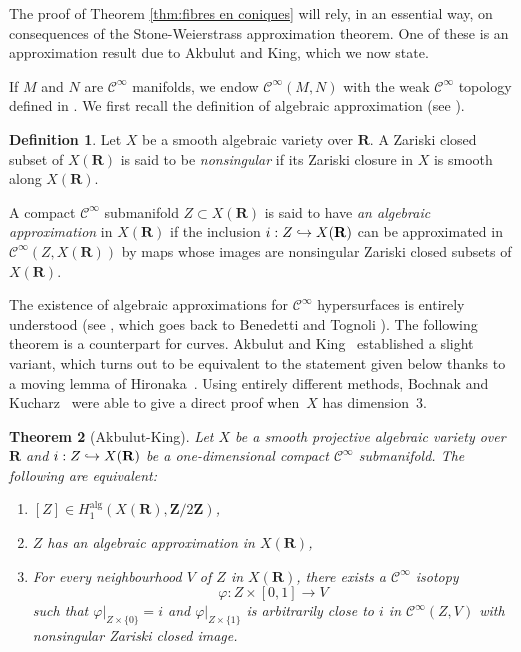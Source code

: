 \documentclass[JEP,XML,SOM,Unicode]{cedram}
\newcommand\hto{\mathrel{\lhook\joinrel\to}}
\theoremstyle{plain}
\newtheorem{thm}{Theorem}[section]
\theoremstyle{definition}
\newtheorem{defn}[thm]{Definition}
\numberwithin{equation}{section}
\newcommand{\alg}{{\mathrm{alg}}}
\newcommand{\R}{{\mathbf R}}
\newcommand{\Z}{{\mathbf Z}}
\renewcommand{\phi}{\varphi}
\newcommand{\ci}{\mathscr{C}^{\infty}}
\begin{document}
The proof of Theorem \ref{thm:fibres en coniques} will rely, in an essential way, on consequences of the Stone-Weierstrass approximation theorem.
One of these is an approximation result
due to Akbulut and King, which we now state.

If $M$ and $N$ are $\ci$ manifolds,
we endow $\ci(M,N)$ with the weak $\ci$ topology defined in \cite[p.\,36]{Hirsch}.
We first recall the definition of algebraic approximation (see \cite[Def.\,12.4.10]{bcr}).

\begin{defn}
\label{def:approximation}
Let $X$ be a smooth algebraic variety over $\R$. A Zariski closed subset of $X(\R)$ is said to be \textit{nonsingular} if its Zariski closure in $X$ is smooth along $X(\R)$.

A compact $\ci$ submanifold $Z\subset X(\R)$ is said to have \textit{an algebraic approximation} in $X(\R)$ if the inclusion $i:Z\hto X(\R)$ can be approximated in $\ci(Z,X(\R))$ by maps whose images are nonsingular Zariski closed subsets of $X(\R)$.
\end{defn}

The existence of algebraic approximations for $\ci$ hypersurfaces is entirely understood (see \cite[Th.\,12.4.11]{bcr}, which goes back to Benedetti and Tognoli \cite[Proof of Th.\,4.1]{BenedettiTognoli}).
The following theorem is a counterpart for curves.
Akbulut and King~\cite{AkbulutKing} established a slight variant,
which turns out to be
equivalent to the statement given below
thanks to
a moving lemma of Hironaka~\cite{hironakasmoothing}.
Using entirely different methods,
Bochnak and Kucharz~\cite{bochnakkucharz} were able to give a direct proof
when~$X$ has dimension~$3$.

\begin{thm}[Akbulut-King]
\label{thm:AK}
Let $X$ be a smooth projective algebraic variety over~$\R$ and $i:Z\hto X(\R)$ be a one-dimensional compact $\ci$ submanifold. The following are equivalent:
\begin{enumerate}
\item\label{thm:AKi} $[Z]\in H_1^{\alg}(X(\R),\Z/2\Z)$,
\item\label{thm:AKii} $Z$ has an algebraic approximation in $X(\R)$,
\item\label{thm:AKiii} For every neighbourhood $V$ of $Z$ in $X(\R)$, there exists a $\ci$ isotopy
\[
\phi:Z\times [0,1]\to V
\] such that $\phi|_{Z\times\{0\}}=i$ and $\phi|_{Z\times\{1\}}$ is arbitrarily close to $i$ in $\ci(Z,V)$ with nonsingular Zariski closed image.
\end{enumerate}
\end{thm}
\end{document}
